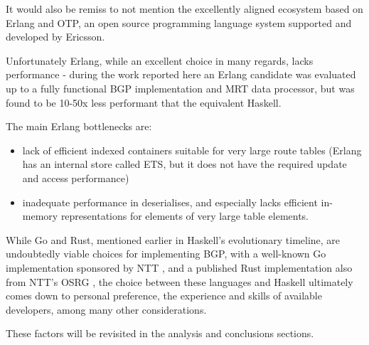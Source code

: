 \bigskip

It would also be remiss to not mention the excellently aligned ecosystem based on Erlang and OTP, an open source programming language system supported and developed by Ericsson. \cite{erlang}

Unfortunately Erlang, while an excellent choice in many regards, lacks performance - during the work reported here an Erlang candidate was evaluated up to a fully functional BGP implementation and MRT data processor, but was found to be 10-50x less performant that the equivalent Haskell.

The main Erlang bottlenecks are:
\begin{itemize}
	\item lack of efficient indexed containers suitable for very large route tables (Erlang has an internal store called ETS, but it does not have the required update and access performance)
	\item inadequate performance in deserialises, and especially lacks efficient in-memory representations for elements of very large table elements.
\end{itemize}
\bigskip

While Go and Rust, mentioned earlier in Haskell's evolutionary timeline, are undoubtedly viable choices for implementing BGP, with a well-known Go implementation sponsored by NTT \cite{2016DeploymentEfficiency}, \cite{NTTGoBGP} and a published Rust implementation also from NTT's OSRG \cite{rustybgp}, the choice between these languages and Haskell ultimately comes down to personal preference, the experience and skills of available developers, among many other considerations.

These factors will be revisited in the analysis and conclusions sections.




